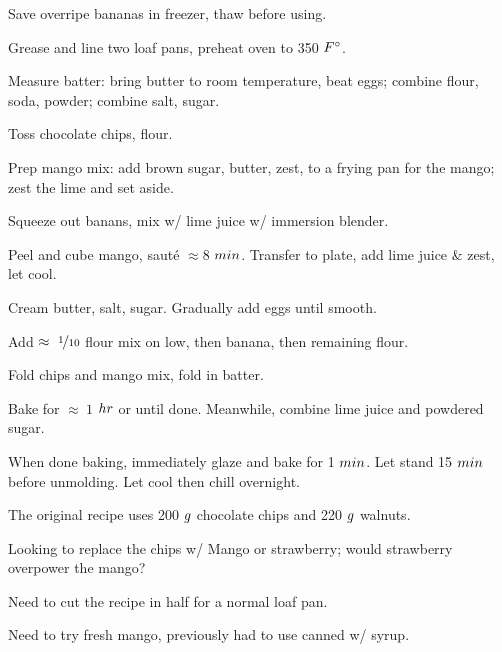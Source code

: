 \begin{preparation}
\item Save overripe bananas in freezer, thaw before using.

\item Grease and line two loaf pans, preheat oven to 350 $\Fahrenheit$.

\item Measure batter: bring butter to room temperature, beat eggs; combine flour, soda, powder; combine salt, sugar.

\item Toss chocolate chips, flour.

\item Prep mango mix: add brown sugar, butter, zest, to a frying pan for the mango;
	zest the lime and set aside.

\item Squeeze out banans, mix w/ lime juice w/ immersion blender.

\item Peel and cube mango, saut\'{e} $\approx 8$ $\minute$.
	Transfer to plate, add lime juice \& zest, let cool.

\item Cream butter, salt, sugar.
	Gradually add eggs until smooth.

\item Add $\approx~\onetenth$ flour mix on low, then banana, then remaining flour.

\item Fold chips and mango mix, fold in batter.

\item Bake for $\approx~1$ $\hour$ or until done.
	Meanwhile, combine lime juice and powdered sugar.

\item When done baking, immediately glaze and bake for 1 $\minute$.
	Let stand 15 $\minute$ before unmolding.
	Let cool then chill overnight.
\end{preparation}

\begin{variation}
\item The original recipe uses 200 $\gram$ chocolate chips and 220 $\gram$ walnuts.
\end{variation}


\begin{experiments}
\item Looking to replace the chips w/ Mango or strawberry; would strawberry overpower the mango?
\item Need to cut the recipe in half for a normal loaf pan.
\item Need to try fresh mango, previously had to use canned w/ syrup.
\end{experiments}


\recipeend%

